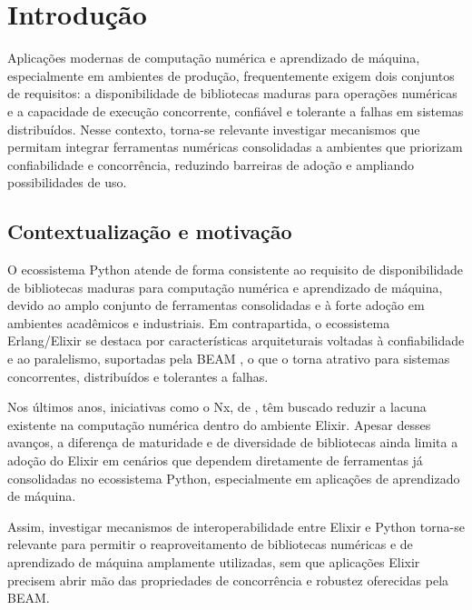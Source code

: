 
\chapter{Introdução}\label{cap:introducao}

Aplicações modernas de computação numérica e aprendizado de máquina, especialmente em ambientes de produção, frequentemente exigem dois conjuntos de requisitos: a disponibilidade de bibliotecas maduras para operações numéricas e a capacidade de execução concorrente, confiável e tolerante a falhas em sistemas distribuídos. Nesse contexto, torna-se relevante investigar mecanismos que permitam integrar ferramentas numéricas consolidadas a ambientes que priorizam confiabilidade e concorrência, reduzindo barreiras de adoção e ampliando possibilidades de uso.

\section{Contextualização e motivação}\label{sec:contextualizacao}

O ecossistema Python atende de forma consistente ao requisito de disponibilidade de bibliotecas maduras para computação numérica e aprendizado de máquina, devido ao amplo conjunto de ferramentas consolidadas \citep{harris2020, jax2024} e à forte adoção em ambientes acadêmicos e industriais. Em contrapartida, o ecossistema Erlang/Elixir se destaca por características arquiteturais voltadas à confiabilidade e ao paralelismo, suportadas pela \gls{BEAM} \citep{armstrong2010}, o que o torna atrativo para sistemas concorrentes, distribuídos e tolerantes a falhas.

Nos últimos anos, iniciativas como o \gls{Nx}, de \citet{nx2024}, têm buscado reduzir a lacuna existente na computação numérica dentro do ambiente Elixir. Apesar desses avanços, a diferença de maturidade e de diversidade de bibliotecas ainda limita a adoção do Elixir em cenários que dependem diretamente de ferramentas já consolidadas no ecossistema Python, especialmente em aplicações de aprendizado de máquina.

Assim, investigar mecanismos de interoperabilidade entre Elixir e Python torna-se relevante para permitir o reaproveitamento de bibliotecas numéricas e de aprendizado de máquina amplamente utilizadas, sem que aplicações Elixir precisem abrir mão das propriedades de concorrência e robustez oferecidas pela \gls{BEAM}.

